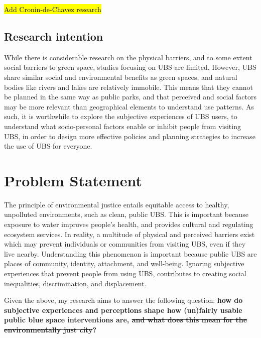 \documentclass{article}
\begin{document}
\hl{Add Cronin-de-Chavez research}


\subsection{Research intention}

While there is considerable research on the physical barriers, and to some extent social barriers to green space, studies focusing on UBS are limited.
However, UBS share similar social and environmental benefits as green spaces, and natural bodies like rivers and lakes are relatively immobile. This means that they cannot be planned in the same way as public parks, and that perceived and social factors may be more relevant than geographical elements to understand use patterns.
As such, it is worthwhile to explore the subjective experiences of UBS users, to understand what socio-personal factors  enable or inhibit people from visiting UBS, in order to design more effective policies and planning strategies to increase the use of UBS for everyone.


\section{Problem Statement}

The principle of environmental justice entails equitable access to healthy, unpolluted environments, such as clean, public UBS. This is important because exposure to water improves people's health, and provides cultural and regulating ecosystem services.
In reality, a multitude of physical and perceived barriers exist which may prevent individuals or communities from visiting UBS, even if they live nearby.
Understanding this phenomenon is important because public UBS are places of community, identity, attachment, and well-being. Ignoring subjective experiences that prevent people from using UBS, contributes to creating social inequalities, discrimination, and displacement.

Given the above, my research aims to answer the following question: \textbf{how do subjective experiences and perceptions shape how (un)fairly usable public blue space interventions are, \sout{and what does this mean for the environmentally just city}?}
\end{document}
